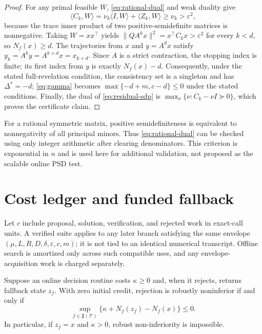 \documentclass[smallextended]{svjour3}
\newcommand{\cT}{\mathcal{T}}
\newcommand{\ip}[2]{\langle #1,#2\rangle}
\newcommand{\norm}[1]{\lVert #1\rVert}
\newcommand{\eps}{\varepsilon}
\begin{document}
\begin{proof}
For any primal feasible $W$, \eqref{eq:rational-dual} and weak duality give
\[
 \ip{C_k}{W}=\nu_k\ip{I}{W}+\ip{Z_k}{W}
 \geq\nu_k>\eps^2,
\]
because the trace inner product of two positive-semidefinite matrices is
nonnegative.  Taking $W=xx^\top$ yields
$\norm{QA^kx}^2=x^\top C_kx>\eps^2$ for every
$k<d$, so $N_f(x)\geq d$.  The trajectories from $x$ and $y=A^dx$ satisfy
$y_k=A^ky=A^{k+d}x=x_{k+d}$.  Since $A$ is a strict contraction, the stopping
index is finite; its first index from $y$ is exactly $N_f(x)-d$.
Consequently, under the stated full-revelation condition, the consistency set
is a singleton and has $\Delta^*=-d$; \eqref{eq:gamma} becomes
$\max\{-d+m,c-d\}\leq0$ under the stated conditions.
Finally, the dual of \eqref{eq:residual-sdp} is
$\max_\nu\{\nu:C_k-\nu I\succeq0\}$, which proves the certificate claim.
\end{proof}

For a rational symmetric matrix, positive semidefiniteness is equivalent to
nonnegativity of all principal minors.  Thus \eqref{eq:rational-dual} can be
checked using only integer arithmetic after clearing denominators.  This
criterion is exponential in $n$ and is used here for additional validation,
not proposed as the scalable online PSD test.

\section{Cost ledger and funded fallback}
\label{sec:cost}

Let $c$ include proposal, solution, verification, and rejected work in
exact-call units.  A verified suite applies to any later branch satisfying the
same envelope $(\mu,L,R,D,\delta,\eps,c,m)$; it is not tied to an identical
numerical transcript.  Offline search is amortized only across such compatible
uses, and any envelope-acquisition work is charged separately.

\begin{proposition}
\label{prop:zero-credit}
Suppose an online decision routine costs $\kappa\geq0$ and, when it rejects,
returns fallback state $z_f$.  With zero initial credit, rejection is robustly
noninferior if and only if
\begin{equation}
 \sup_{f\in\mathfrak F(\cT)}
 \{\kappa+N_f(z_f)-N_f(x)\}\leq0.                  \label{eq:fallback}
\end{equation}
In particular, if $z_f=x$ and $\kappa>0$, robust non-inferiority is impossible.
\end{proposition}
\end{document}

